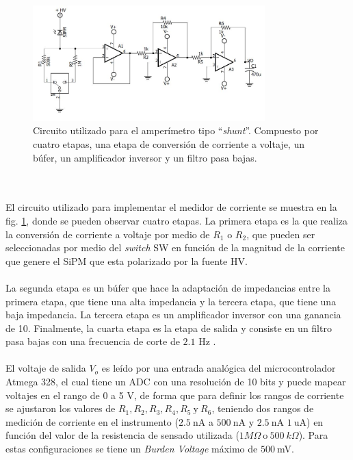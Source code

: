 \begin{figure}[h!]
\begin{centering}
  \includegraphics[width=0.8\textwidth]{Images/ammeter.JPG}
    \caption{Circuito utilizado para el amperímetro tipo ``\textit{shunt}''. Compuesto por cuatro etapas, una etapa de conversión de corriente a voltaje, un búfer, un amplificador inversor y un filtro pasa bajas.  }
    \label{fig:ammeter}
  \par\end{centering}
\end{figure}
\\ \\
El circuito utilizado para implementar el medidor de corriente se muestra en la fig. \ref{fig:ammeter}, donde se pueden observar cuatro etapas. La primera etapa es la que realiza la conversión de corriente a voltaje por medio de $R_1$ o $R_2$, que pueden ser seleccionadas por medio del \textit{switch} SW en función de la magnitud de la corriente que genere el SiPM que esta polarizado por la fuente HV. \\ \\
La segunda etapa es un búfer que hace la adaptación de impedancias entre la primera etapa, que tiene una alta impedancia y la tercera etapa, que tiene una baja impedancia. La tercera etapa es un amplificador inversor con una ganancia de 10. Finalmente, la cuarta etapa es la etapa de salida y consiste en un filtro pasa bajas con una frecuencia de corte de $2.1$ Hz .\\ \\
El voltaje de salida $V_o$ es leído por una entrada analógica del microcontrolador Atmega 328, el cual tiene un ADC con una resolución de 10 bits y  puede mapear voltajes en el rango de 0 a 5 V, de forma que para definir los rangos de corriente se ajustaron los valores de $R_1, R_2, R_3, R_4, R_5~\mbox{y}~R_6$, teniendo dos rangos de medición de corriente en el instrumento ($2.5~\mbox{nA}$ a $500~\mbox{nA}$ y $2.5~\mbox{nA}$ $1~\mbox{uA}$) en función del valor de la resistencia de sensado utilizada ($1M\Omega~\mbox{o}~500~k\Omega$). Para estas configuraciones se tiene un \textit{Burden Voltage} máximo de $500~$mV.\\ \\
